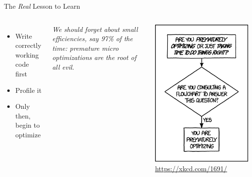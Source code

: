 
\begin{frame}{The \emph{Real} Lesson to Learn}
%
\begin{columns}
\begin{itemize}
\item Write correctly working code first
\item Profile it
\item Only then, begin to optimize
\end{itemize}

\vspace{6pt}
\begin{hintbox}
\emph{We should forget about small efficiencies, say 97\% of the time: premature micro optimizations are the root of all evil.}
\end{hintbox}
%
\begin{center}
\includegraphics[width=.8\linewidth]{./gfx/02-xkcd-premature-optimization}
\scriptsize
\url{https://xkcd.com/1691/}
\end{center}
\end{columns}
%
\end{frame}

